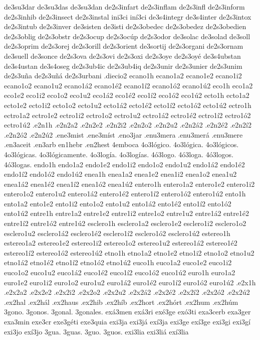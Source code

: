 {de3su3dar
de3su3das
de3su3dan
de2s3infart
de2s3inflam
de2s3infl
de2s3inform
de2s3inhib
de2s3insect
de2s3instal
ini3ci
iní3ci
de3s4integr
de3s4inter
de2s3intox
de2s3intub
de2s3inver
de3sisten
de3isti
de2s3obedec
de2s3obedez
de2s3obedien
de2s3oblig
de2s3obstr
de2s3ocup
de2s3ocúp
de2s3odor
de3solac
de3solad
de3soll
de2s3oprim
de2s3orej
de2s3orill
de2s3orient
de3sortij
de2s3organi
de2s3ornam
de3suell
de3sonce
de2s3ova
de2s3ovi
de2s3oxi
de2s3oye
de2s3oyé
de3s4ubstan
de3s4ustan
de3s4oseg
de2s3ub4ic
de2s3ub4iq
de2s3unir
de2s3unier
de2s3unim
de2s3uña
de2s3uñá
de2s3urbani
.diecio2
ecano1h
ecano1a2 ecano1e2 ecano1i2 ecano1o2 ecano1u2
ecano1á2 ecano1é2 ecano1í2 ecano1ó2 ecano1ú2
eco1h
eco1a2 eco1e2 eco1i2 eco1o2 eco1u2
eco1á2 eco1é2 eco1í2 eco1ó2 eco1ú2
ecto1h
ecto1a2 ecto1e2 ecto1i2 ecto1o2 ecto1u2
ecto1á2 ecto1é2 ecto1í2 ecto1ó2 ecto1ú2
ectro1h
ectro1a2 ectro1e2 ectro1i2 ectro1o2 ectro1u2
ectro1á2 ectro1é2 ectro1í2 ectro1ó2 ectro1ú2
.e2n1h
.e2n2a2 .e2n2e2 .e2n2i2 .e2n2o2 .e2n2u2
.e2n2á2 .e2n2é2 .e2n2í2 .e2n2ó2 .e2n2ú2
.ene3mist
.ene3míst
.eno3jar
.enu3mera
.enu3merá
.enu3mere
.en3aceit
.en3arb
en1hebr
.en2hest
4emboca
4o3lógico.
4o3lógica.
4o3lógicos.
4o3lógicas.
4o3lógicamente.
4o3logía.
4o3logías.
4ó3logo.
4ó3loga.
4ó3logos.
4ó3logas.
endo1h
endo1a2 endo1e2 endo1i2 endo1o2 endo1u2
endo1á2 endo1é2 endo1í2 endo1ó2 endo1ú2
enea1h
enea1a2 enea1e2 enea1i2 enea1o2 enea1u2
enea1á2 enea1é2 enea1í2 enea1ó2 enea1ú2
entero1h
entero1a2 entero1e2 entero1i2 entero1o2 entero1u2
entero1á2 entero1é2 entero1í2 entero1ó2 entero1ú2
ento1h
ento1a2 ento1e2 ento1i2 ento1o2 ento1u2
ento1á2 ento1é2 ento1í2 ento1ó2 ento1ú2
entre1h
entre1a2 entre1e2 entre1i2 entre1o2 entre1u2
entre1á2 entre1é2 entre1í2 entre1ó2 entre1ú2
esclero1h
esclero1a2 esclero1e2 esclero1i2 esclero1o2 esclero1u2
esclero1á2 esclero1é2 esclero1í2 esclero1ó2 esclero1ú2
estereo1h
estereo1a2 estereo1e2 estereo1i2 estereo1o2 estereo1u2
estereo1á2 estereo1é2 estereo1í2 estereo1ó2 estereo1ú2
etno1h
etno1a2 etno1e2 etno1i2 etno1o2 etno1u2
etno1á2 etno1é2 etno1í2 etno1ó2 etno1ú2
euco1h
euco1a2 euco1e2 euco1i2 euco1o2 euco1u2
euco1á2 euco1é2 euco1í2 euco1ó2 euco1ú2
euro1h
euro1a2 euro1e2 euro1i2 euro1o2 euro1u2
euro1á2 euro1é2 euro1í2 euro1ó2 euro1ú2
.e2x1h
.e2x2a2 .e2x2e2 .e2x2i2 .e2x2o2 .e2x2u2
.e2x2á2 .e2x2é2 .e2x2í2 .e2x2ó2 .e2x2ú2
.ex2hal
.ex2hál
.ex2haus
.ex2hib
.ex2híb
.ex2hort
.ex2hórt
.ex2hum
.ex2húm
3gono.
3gonos.
3gonal.
3gonales.
exá3men
exá3ri
exé3ge
exó3ti
exa3cerb
exa3ger
exa3min
exe3cr
exe3géti
exe3quia
exi3ja
exi3já
exí3ja
exi3ge
exí3ge
exi3gi
exi3gí
exi3jo
exí3jo
3gua.
3guas.
3guo.
3guos.
exi3lia
exi3liá
exí3lia
}
